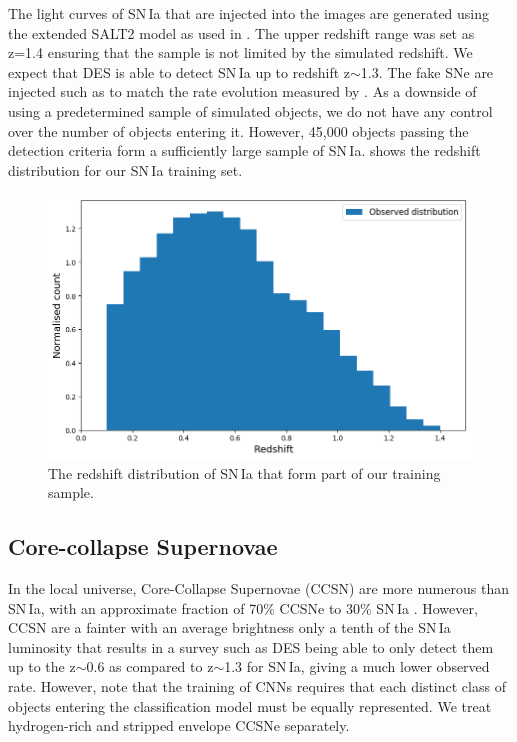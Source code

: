 The light curves of SN\,Ia that are injected into the images are generated using the extended SALT2 model as used in \citet{Betoule2014}. The upper redshift range was set as z=1.4 ensuring that the sample is not limited by the simulated redshift. We expect that DES is able to detect SN\,Ia up to redshift z$\sim$1.3. The fake SNe are injected such as to match the rate evolution measured by \citet{Perrett2012}. As a downside of using a predetermined sample of simulated objects, we do not have any control over the number of objects entering it. However, 45,000 objects passing the detection criteria form a sufficiently large sample of SN\,Ia.  shows the redshift distribution for our SN\,Ia training set.

\begin{figure}
  \includegraphics[width=\textwidth]{Figures/Chapter5/SNIa_z_dist.png}
  \caption{The redshift distribution of SN\,Ia that form part of our training sample. }
  \label{fig:IaDist}
\end{figure}

\subsection{Core-collapse Supernovae}
In the local universe, Core-Collapse Supernovae (CCSN) are more numerous than SN\,Ia, with an approximate fraction of 70\% CCSNe to 30\% SN\,Ia  \citep{Alsabti2017}. However, CCSN are a fainter with an average brightness only a tenth of the SN\,Ia luminosity that results in a survey such as DES being able to only detect them up to the z$\sim$0.6 as compared to z$\sim$1.3 for SN\,Ia, giving a much lower observed rate. However, note that the training of CNNs requires that each distinct class of objects entering the classification model must be equally represented. We treat hydrogen-rich and stripped envelope CCSNe separately.


